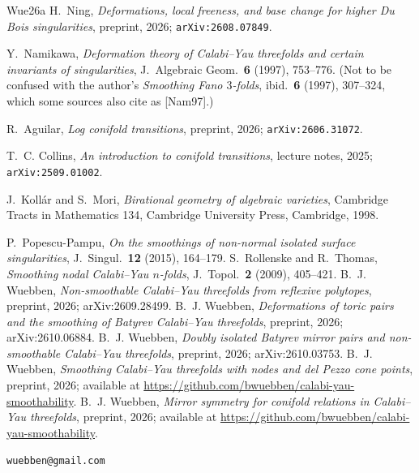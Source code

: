 \documentclass[11pt]{amsart}
\theoremstyle{definition}
\theoremstyle{remark}
\theoremstyle{plain}
\begin{document}
\begin{thebibliography}{Wue26a}
 H.~Ning, \emph{Deformations, local freeness, and base
change for higher Du Bois singularities}, preprint, 2026;
\texttt{arXiv:2608.07849}.

 Y.~Namikawa, \emph{Deformation theory of
Calabi--Yau threefolds and certain invariants of singularities}, J.\ Algebraic
Geom.\ \textbf{6} (1997), 753--776.  (Not to be confused with the author's
\emph{Smoothing Fano $3$-folds}, ibid.\ \textbf{6} (1997), 307--324, which some
sources also cite as [Nam97].)

 R.~Aguilar, \emph{Log conifold transitions},
preprint, 2026; \texttt{arXiv:2606.31072}.

 T.~C. Collins, \emph{An introduction to conifold
transitions}, lecture notes, 2025; \texttt{arXiv:2509.01002}.

 J.~Koll\'ar and S.~Mori, \emph{Birational
geometry of algebraic varieties}, Cambridge Tracts in Mathematics 134,
Cambridge University Press, Cambridge, 1998.

 P.~Popescu-Pampu, \emph{On the smoothings of
non-normal isolated surface singularities}, J.\ Singul.\ \textbf{12}
(2015), 164--179.
 S.~Rollenske and R.~Thomas, \emph{Smoothing nodal
Calabi--Yau $n$-folds}, J.\ Topol.\ \textbf{2} (2009), 405--421.
 B.~J. Wuebben, \emph{Non-smoothable Calabi--Yau
threefolds from reflexive polytopes}, preprint, 2026;
arXiv:2609.28499.
 B.~J. Wuebben, \emph{Deformations of toric pairs
and the smoothing of Batyrev Calabi--Yau threefolds}, preprint, 2026;
arXiv:2610.06884.
 B.~J. Wuebben, \emph{Doubly isolated Batyrev
mirror pairs and non-smoothable Calabi--Yau threefolds}, preprint, 2026;
arXiv:2610.03753.
 B.~J. Wuebben, \emph{Smoothing Calabi--Yau
threefolds with nodes and del Pezzo cone points}, preprint, 2026; available
at \url{https://github.com/bwuebben/calabi-yau-smoothability}.
 B.~J. Wuebben, \emph{Mirror symmetry for conifold
relations in Calabi--Yau threefolds}, preprint, 2026; available at
\url{https://github.com/bwuebben/calabi-yau-smoothability}.
\end{thebibliography}

\bigskip
{}
\texttt{wuebben@gmail.com}
\end{document}
